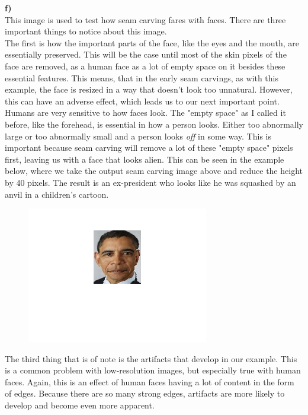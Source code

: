 \documentclass[12pt]{article}
\begin{document}
\noindent
\textbf{f)} \\
This image is used to test how seam carving fares with faces. There are three important things to notice about this image. \\
The first is how the important parts of the face, like the eyes and the mouth, are essentially preserved. This will be the case until most of the skin pixels of the face are removed, as a human face as a lot of empty space on it besides these essential features. This means, that in the early seam carvings, as with this example, the face is resized in a way that doesn't look too unnatural. However, this can have an adverse effect, which leads us to our next important point. \\
Humans are very sensitive to how faces look. The "empty space" as I called it before, like the forehead, is essential in how a person looks. Either too abnormally large or too abnormally small and a person looks \textit{off} in some way. This is important because seam carving will remove a lot of these "empty space" pixels first, leaving us with a face that looks alien. This can be seen in the example below, where we take the output seam carving image above and reduce the height by 40 pixels. The result is an ex-president who looks like he was squashed by an anvil in a children's cartoon.\\

\begin{figure}[H]
  \includegraphics[width=\linewidth]{PS1_Q6_1_extra.png}
\end{figure}

\noindent
The third thing that is of note is the artifacts that develop in our example. This is a common problem with low-resolution images, but especially true with human faces. Again, this is an effect of human faces having a lot of content in the form of edges. Because there are so many strong edges, artifacts are more likely to develop and become even more apparent. 
\end{document}
